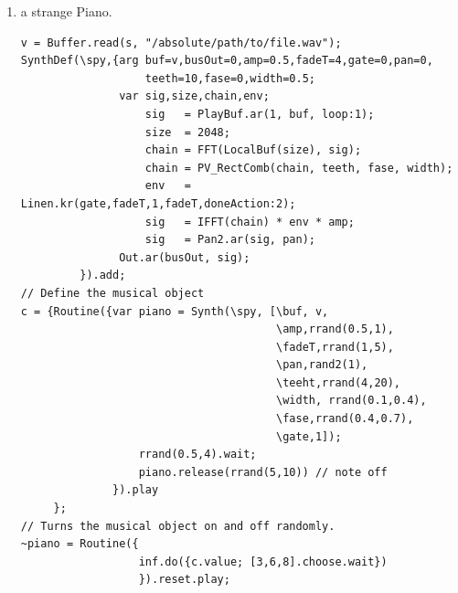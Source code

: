 \begin{enumerate}
\begin{lstlisting}[frame=single]
SynthDef(\pik, {arg bufn=4,freq=400,dur= 1,amp=0,pan=0,t_gate=0;
                var sig,env;
                    env = Env.perc(0.01,dur-0.01);
                    env = EnvGen.kr(env,t_gate,doneAction:2); 
                    sig = VOsc.ar(env.linlin(0,1,0,bufn), freq);
                    sig = Pan2.ar(sig * amp * env,pan);
                Out.ar(0, sig)
                }).add;
// Define the musical object
b = {Routine({
              rrand(2,10).do({ Synth(\pik,[\freq,
                             [90,94,95,97,100,104,105].choose.midicps,
                                          \dur, exprand(0.3,4.3),
                                          \amp, rrand(0.01,0.1),
                                          \pan, rand2(1),
                                          \t_gate,1,
                                          [0.15,0.1,0.2,0.25].choose.wait})
              }).play;
     }
// Turns the musical object on and off randomly. 
~plink = Routine({
                  inf.do({b.value; [3,6,8].choose.wait})
                  }).reset.play;
\end{lstlisting}

\item a strange Piano.

\begin{lstlisting}[frame=single] 
v = Buffer.read(s, "/absolute/path/to/file.wav");
SynthDef(\spy,{arg buf=v,busOut=0,amp=0.5,fadeT=4,gate=0,pan=0,
                   teeth=10,fase=0,width=0.5;
               var sig,size,chain,env;
                   sig   = PlayBuf.ar(1, buf, loop:1);
                   size  = 2048;
                   chain = FFT(LocalBuf(size), sig);
                   chain = PV_RectComb(chain, teeth, fase, width);
                   env   = Linen.kr(gate,fadeT,1,fadeT,doneAction:2);
                   sig   = IFFT(chain) * env * amp;
                   sig   = Pan2.ar(sig, pan);
               Out.ar(busOut, sig);
         }).add;
// Define the musical object       
c = {Routine({var piano = Synth(\spy, [\buf, v, 
                                       \amp,rrand(0.5,1), 
                                       \fadeT,rrand(1,5),
                                       \pan,rand2(1),
                                       \teeht,rrand(4,20),
                                       \width, rrand(0.1,0.4),
                                       \fase,rrand(0.4,0.7),
                                       \gate,1]);
                  rrand(0.5,4).wait;
                  piano.release(rrand(5,10)) // note off
              }).play
     };
// Turns the musical object on and off randomly. 
~piano = Routine({
                  inf.do({c.value; [3,6,8].choose.wait})
                  }).reset.play;
\end{lstlisting}

\end{enumerate}

